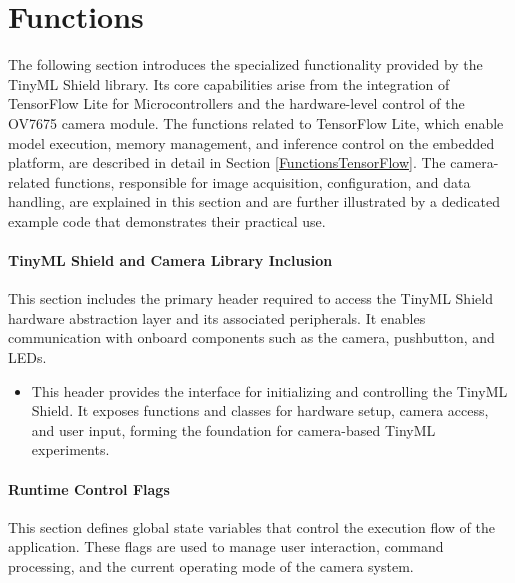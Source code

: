 \section{Functions} \label{FunctionsHavard}

The following section introduces the specialized functionality provided by the TinyML Shield library. Its core capabilities arise from the integration of TensorFlow Lite for Microcontrollers and the hardware-level control of the OV7675 camera module. The functions related to TensorFlow Lite, which enable model execution, memory management, and inference control on the embedded platform, are described in detail in Section \ref{FunctionsTensorFlow}. The camera-related functions, responsible for image acquisition, configuration, and data handling, are explained in this section and are further illustrated by a dedicated example code that demonstrates their practical use.


\paragraph{TinyML Shield and Camera Library Inclusion}

This section includes the primary header required to access the TinyML Shield hardware abstraction layer and its associated peripherals. It enables communication with onboard components such as the camera, pushbutton, and LEDs.

\begin{itemize}
	\item {} 
	
	This header provides the interface for initializing and controlling the TinyML Shield. It exposes functions and classes for hardware setup, camera access, and user input, forming the foundation for camera-based TinyML experiments.
\end{itemize}


\paragraph{Runtime Control Flags}

This section defines global state variables that control the execution flow of the application. These flags are used to manage user interaction, command processing, and the current operating mode of the camera system.

